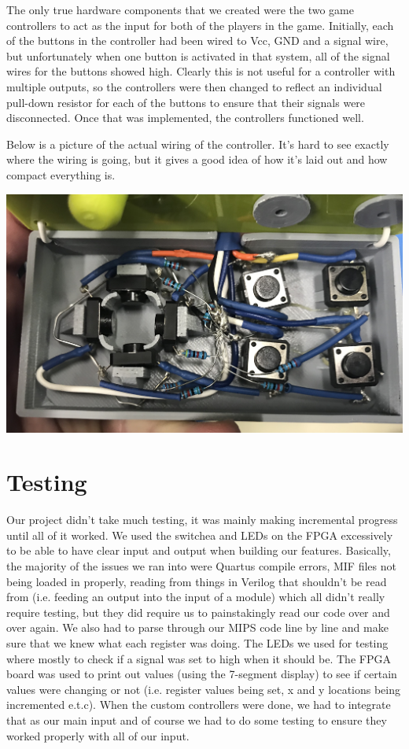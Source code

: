 \documentclass[letterpaper]{article} %
\begin{document}
	The only true hardware components that we created were the two game controllers to act as the input for both of the players in the game. Initially, each of the buttons in the controller had been wired to Vcc, GND and a signal wire, but unfortunately when one button is activated in that system, all of the signal wires for the buttons showed high. Clearly this is not useful for a controller with multiple outputs, so the controllers were then changed to reflect an individual pull-down resistor for each of the buttons to ensure that their signals were disconnected. Once that was implemented, the controllers functioned well.\par
	Below is a picture of the actual wiring of the controller. It's hard to see exactly where the wiring is going, but it gives a good idea of how it's laid out and how compact everything is. \par
	\begin{center}
		\includegraphics[scale=.08]{controller_internals1}
	\end{center}\par

\section{Testing}
	Our project didn't take much testing, it was mainly making incremental progress until all of it worked. We used the switchea and LEDs on the FPGA excessively to be able to have clear input and output when building our features. Basically, the majority of the issues we ran into were Quartus compile errors, MIF files not being loaded in properly, reading from things in Verilog that shouldn't be read from (i.e. feeding an output into the input of a module) which all didn't really require testing, but they did require us to painstakingly read our code over and over again. We also had to parse through our MIPS code line by line and make sure that we knew what each register was doing. The LEDs we used for testing where mostly to check if a signal was set to high when it should be. The FPGA board was used to print out values (using the 7-segment display) to see if certain values were changing or not (i.e. register values being set, x and y locations being incremented e.t.c). When the custom controllers were done, we had to integrate that as our main input and of course we had to do some testing to ensure they worked properly with all of our input.\par
\end{document}
